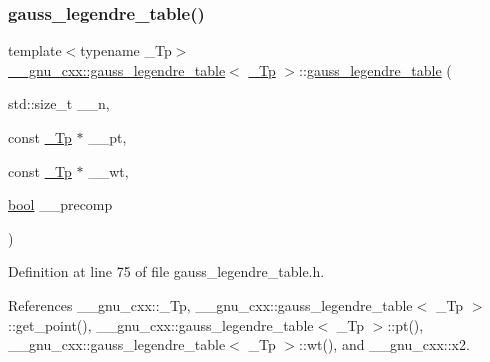 \subsubsection{\texorpdfstring{gauss\+\_\+legendre\+\_\+table()}{gauss\_legendre\_table()}\hspace{0.1cm}{\footnotesize\ttfamily [1/2]}}
{\footnotesize\ttfamily template$<$typename \+\_\+\+Tp$>$ \\
\hyperlink{struct____gnu__cxx_1_1gauss__legendre__table}{\+\_\+\+\_\+gnu\+\_\+cxx\+::gauss\+\_\+legendre\+\_\+table}$<$ \hyperlink{namespace____gnu__cxx_a3b19a9c800ca194374ef9172290f7d79}{\+\_\+\+Tp} $>$\+::\hyperlink{struct____gnu__cxx_1_1gauss__legendre__table}{gauss\+\_\+legendre\+\_\+table} (\begin{DoxyParamCaption}\item[{std\+::size\+\_\+t}]{\+\_\+\+\_\+n,  }\item[{const \hyperlink{namespace____gnu__cxx_a3b19a9c800ca194374ef9172290f7d79}{\+\_\+\+Tp} $\ast$}]{\+\_\+\+\_\+pt,  }\item[{const \hyperlink{namespace____gnu__cxx_a3b19a9c800ca194374ef9172290f7d79}{\+\_\+\+Tp} $\ast$}]{\+\_\+\+\_\+wt,  }\item[{\hyperlink{namespace____gnu__cxx_ae83aca57f97767d5d09188718728a0ac}{bool}}]{\+\_\+\+\_\+precomp }\end{DoxyParamCaption})\hspace{0.3cm}{\ttfamily [inline]}}



Definition at line 75 of file gauss\+\_\+legendre\+\_\+table.\+h.



References \+\_\+\+\_\+gnu\+\_\+cxx\+::\+\_\+\+Tp, \+\_\+\+\_\+gnu\+\_\+cxx\+::gauss\+\_\+legendre\+\_\+table$<$ \+\_\+\+Tp $>$\+::get\+\_\+point(), \+\_\+\+\_\+gnu\+\_\+cxx\+::gauss\+\_\+legendre\+\_\+table$<$ \+\_\+\+Tp $>$\+::pt(), \+\_\+\+\_\+gnu\+\_\+cxx\+::gauss\+\_\+legendre\+\_\+table$<$ \+\_\+\+Tp $>$\+::wt(), and \+\_\+\+\_\+gnu\+\_\+cxx\+::x2.


